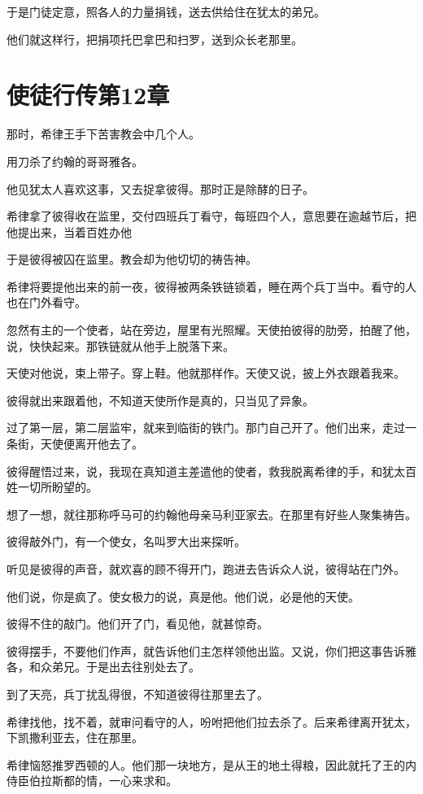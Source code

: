 \documentclass[12pt,oneside]{book}
\begin{document}
于是门徒定意，照各人的力量捐钱，送去供给住在犹太的弟兄。

他们就这样行，把捐项托巴拿巴和扫罗，送到众长老那里。

\chapter{使徒行传第12章}
那时，希律王手下苦害教会中几个人。

用刀杀了约翰的哥哥雅各。

他见犹太人喜欢这事，又去捉拿彼得。那时正是除酵的日子。

希律拿了彼得收在监里，交付四班兵丁看守，每班四个人，意思要在逾越节后，把他提出来，当着百姓办他

于是彼得被囚在监里。教会却为他切切的祷告神。

希律将要提他出来的前一夜，彼得被两条铁链锁着，睡在两个兵丁当中。看守的人也在门外看守。

忽然有主的一个使者，站在旁边，屋里有光照耀。天使拍彼得的肋旁，拍醒了他，说，快快起来。那铁链就从他手上脱落下来。

天使对他说，束上带子。穿上鞋。他就那样作。天使又说，披上外衣跟着我来。

彼得就出来跟着他，不知道天使所作是真的，只当见了异象。

过了第一层，第二层监牢，就来到临街的铁门。那门自己开了。他们出来，走过一条街，天使便离开他去了。

彼得醒悟过来，说，我现在真知道主差遣他的使者，救我脱离希律的手，和犹太百姓一切所盼望的。

想了一想，就往那称呼马可的约翰他母亲马利亚家去。在那里有好些人聚集祷告。

彼得敲外门，有一个使女，名叫罗大出来探听。

听见是彼得的声音，就欢喜的顾不得开门，跑进去告诉众人说，彼得站在门外。

他们说，你是疯了。使女极力的说，真是他。他们说，必是他的天使。

彼得不住的敲门。他们开了门，看见他，就甚惊奇。

彼得摆手，不要他们作声，就告诉他们主怎样领他出监。又说，你们把这事告诉雅各，和众弟兄。于是出去往别处去了。

到了天亮，兵丁扰乱得很，不知道彼得往那里去了。

希律找他，找不着，就审问看守的人，吩咐把他们拉去杀了。后来希律离开犹太，下凯撒利亚去，住在那里。

希律恼怒推罗西顿的人。他们那一块地方，是从王的地土得粮，因此就托了王的内侍臣伯拉斯都的情，一心来求和。
\end{document}
